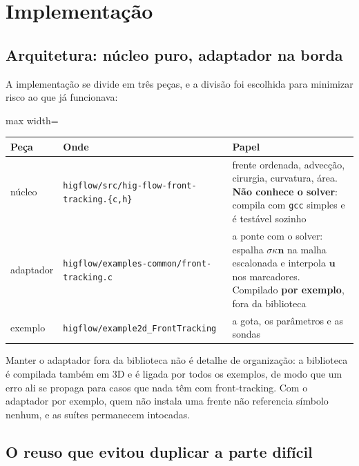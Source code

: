 \section{Implementa\c{c}\~ao}

\subsection{Arquitetura: n\'ucleo puro, adaptador na borda}

A implementa\c{c}\~ao se divide em tr\^es pe\c{c}as, e a divis\~ao foi escolhida
para minimizar risco ao que j\'a funcionava:

\begin{center}
\begin{adjustbox}{max width=\linewidth}
\begin{tabular}{llp{6.6cm}}
\toprule
Pe\c{c}a & Onde & Papel \\
\midrule
n\'ucleo & \texttt{higflow/\allowbreak{}src/\allowbreak{}hig-\allowbreak{}flow-\allowbreak{}front-\allowbreak{}tracking.\allowbreak{}\{c,h\}} &
  frente ordenada, advec\c{c}\~ao, cirurgia, curvatura, \'area. \textbf{N\~ao
  conhece o solver}: compila com \texttt{gcc} simples e \'e test\'avel sozinho \\
adaptador & \texttt{higflow/\allowbreak{}examples-\allowbreak{}common/\allowbreak{}front-\allowbreak{}tracking.\allowbreak{}c} &
  a ponte com o solver: espalha $\sigma\kappa\mathbf{n}$ na malha escalonada e
  interpola $\mathbf{u}$ nos marcadores. Compilado \textbf{por exemplo}, fora da
  biblioteca \\
exemplo & \texttt{higflow/\allowbreak{}example2d\_\allowbreak{}Front\allowbreak{}Tracking} &
  a gota, os par\^ametros e as sondas \\
\bottomrule
\end{tabular}
\end{adjustbox}
\end{center}

Manter o adaptador fora da biblioteca n\~ao \'e detalhe de organiza\c{c}\~ao: a
biblioteca \'e compilada tamb\'em em 3D e \'e ligada por todos os exemplos, de
modo que um erro ali se propaga para casos que nada t\^em com front-tracking. Com
o adaptador por exemplo, quem n\~ao instala uma frente n\~ao referencia
s\'imbolo nenhum, e as su\'ites permanecem intocadas.

\subsection{O reuso que evitou duplicar a parte dif\'icil}

